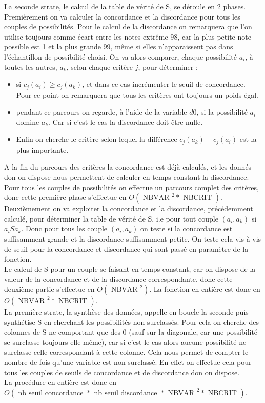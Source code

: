 \documentclass[12pt,a4paper]{article}
\begin{document}
La seconde strate, le calcul de la table de vérité de S, se déroule en 2 phases.\\
Premièrement on va calculer la concordance et la discordance pour tous les couples de possibilités. Pour le calcul de la discordance on remarquera que l'on utilise toujours comme écart entre les notes extrême 98, car la plus petite note possible est 1 et la plus grande 99, même si elles n’apparaissent pas dans l’échantillon de possibilité choisi. On va alors comparer, chaque possibilité $a_i$, à toutes les autres, $a_k$, selon chaque critère $j$, pour déterminer :
\begin{itemize}
\item
si $c_j(a_i) \geqslant c_j(a_k)$, et dans ce cas incrémenter le seuil de concordance. Pour ce point on remarquera que tous les critères ont toujours un poids égal.
\item
pendant ce parcours on regarde, à l'aide de la variable $d0$, si la possibilité $a_i$ domine $a_k$. Car si c'est le cas la discordance doit être nulle.
\item
Enfin on cherche le critère selon lequel la différence $c_j(a_k) - c_j(a_i)$ est la plus importante.
\end{itemize}
A la fin du parcours des critères la concordance est déjà calculés, et les donnés don on dispose nous permettent de calculer en temps constant la discordance.\\
Pour tous les couples de possibilités on effectue un parcours complet des critères, donc cette première phase s’effectue en $O(\text{ NBVAR }^2 * \text{ NBCRIT })$.\\
Deuxièmement on va exploiter la concordance et la discordance, précédemment calculé, pour déterminer la table de vérité de S, i.e pour tout couple $( a_i , a_k )$ si $a_i S a_k$. Donc pour tous les couple $( a_i , a_k )$ on teste si la concordance est suffisamment grande et la discordance suffisamment petite. On teste cela vis à vis de seuil pour la concordance et discordance qui sont passé en paramètre de la fonction.\\
Le calcul de S pour un couple se faisant en temps constant, car on dispose de la valeur de la concordance et de la discordance correspondante, donc cette deuxième partie s'effectue en $O(\text{ NBVAR }^2)$. La fonction en entière est donc en $O(\text{ NBVAR }^2 * \text{ NBCRIT })$.\\

La première strate, la synthèse des données, appelle en boucle la seconde puis synthétise S en cherchant les possibilités non-surclassés. Pour cela on cherche des colonnes de S ne comportant que des 0 (sauf sur la diagonale, car une possibilité se surclasse toujours elle même), car si c'est le cas alors aucune possibilité ne surclasse celle correspondant à cette colonne. Cela nous permet de compter le nombre de fois qu'une variable est non-surclassé. En effet on effectue cela pour tous les couples de seuils de concordance et de discordance don on dispose.\\
La procédure en entière est donc en $O(\text{ nb seuil concordance } * \text{ nb seuil discordance } * \text{ NBVAR }^2 * \text{ NBCRIT })$.
\end{document}

